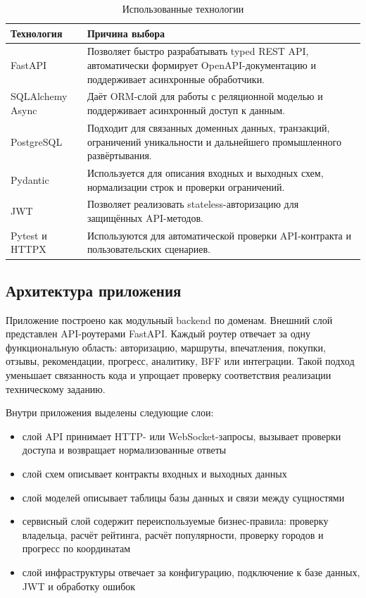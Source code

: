 \documentclass[a4paper,12pt]{extarticle}
\begin{document}
\begin{table}[ht]
	\caption{Использованные технологии}
	\label{table:technologies}
	\centering
		\begin{tabular}{L{0.22\textwidth}L{0.64\textwidth}}
		\toprule
		Технология & Причина выбора \\
		\midrule
		FastAPI & Позволяет быстро разрабатывать typed REST API, автоматически формирует OpenAPI-документацию и поддерживает асинхронные обработчики. \\
		SQLAlchemy Async & Даёт ORM-слой для работы с реляционной моделью и поддерживает асинхронный доступ к данным. \\
		PostgreSQL & Подходит для связанных доменных данных, транзакций, ограничений уникальности и дальнейшего промышленного развёртывания. \\
		Pydantic & Используется для описания входных и выходных схем, нормализации строк и проверки ограничений. \\
		JWT & Позволяет реализовать stateless-авторизацию для защищённых API-методов. \\
		Pytest и HTTPX & Используются для автоматической проверки API-контракта и пользовательских сценариев. \\
		\bottomrule
	\end{tabular}
\end{table}

\subsection{Архитектура приложения}

Приложение построено как модульный backend по доменам. Внешний слой представлен API-роутерами FastAPI. Каждый роутер отвечает за одну функциональную область: авторизацию, маршруты, впечатления, покупки, отзывы, рекомендации, прогресс, аналитику, BFF или интеграции. Такой подход уменьшает связанность кода и упрощает проверку соответствия реализации техническому заданию.

Внутри приложения выделены следующие слои:
\begin{itemize}
	\item слой API принимает HTTP- или WebSocket-запросы, вызывает проверки доступа и возвращает нормализованные ответы
	\item слой схем описывает контракты входных и выходных данных
	\item слой моделей описывает таблицы базы данных и связи между сущностями
	\item сервисный слой содержит переиспользуемые бизнес-правила: проверку владельца, расчёт рейтинга, расчёт популярности, проверку городов и прогресс по координатам
	\item слой инфраструктуры отвечает за конфигурацию, подключение к базе данных, JWT и обработку ошибок
\end{itemize}
\end{document}
